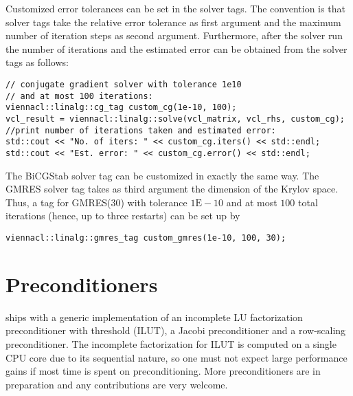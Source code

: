 Customized error tolerances can be set in the solver tags. The convention is
that solver tags take the relative error tolerance as first argument and the
maximum number of iteration steps as second argument. Furthermore, after the
solver run the number of iterations and the estimated error can be obtained from
the solver tags as follows:
\begin{lstlisting}
// conjugate gradient solver with tolerance 1e10
// and at most 100 iterations:
viennacl::linalg::cg_tag custom_cg(1e-10, 100);
vcl_result = viennacl::linalg::solve(vcl_matrix, vcl_rhs, custom_cg);
//print number of iterations taken and estimated error:
std::cout << "No. of iters: " << custom_cg.iters() << std::endl;
std::cout << "Est. error: " << custom_cg.error() << std::endl;
\end{lstlisting}
The BiCGStab solver tag can be customized in exactly the same way. The GMRES
solver tag takes as third argument the dimension of the Krylov space. Thus, a
tag for GMRES(30) with tolerance $1\mathrm{E}\!-\!10$ and at most $100$ total
iterations
(hence, up to three restarts) can be set up by 
\begin{lstlisting}
viennacl::linalg::gmres_tag custom_gmres(1e-10, 100, 30);
\end{lstlisting}

\section{Preconditioners}
{\ViennaCL} ships with a generic implementation of an incomplete LU
factorization preconditioner with threshold (ILUT), a Jacobi preconditioner and
a row-scaling preconditioner. The incomplete factorization for ILUT is computed
on a single CPU core due to its sequential nature, so one must not expect large
performance gains if most time is spent on preconditioning. More
preconditioners are in preparation and any contributions are very welcome.


